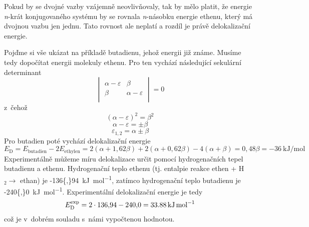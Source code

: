 Pokud by se dvojné vazby vzájemně neovlivňovaly, tak by mělo platit, že  energie
\textit{n}-krát konjugovaného systému by se rovnala \textit{n}-násobku energie ethenu, který má dvojnou vazbu jen jednu. Tato rovnost ale neplatí a rozdíl je právě delokalizační energie. 

Pojďme si vše ukázat na příkladě butadienu, jehož energii již známe. Musíme tedy dopočítat energii molekuly ethenu. Pro ten vychází následující sekulární determinant 
\begin{equation}
\begin{vmatrix}
\alpha - \varepsilon & \beta \\
\beta & \alpha - \varepsilon \\
\end{vmatrix}
=0
\end{equation}
z~čehož
$$
(\alpha-\varepsilon)^2=\beta^2
$$
$$
\alpha - \varepsilon = \pm \beta
$$
$$
\varepsilon_{1,2}= \alpha\pm \beta 
$$
Pro butadien poté vychází delokalizační energie
\begin{equation}
E_{\mathrm{D}} = E_{\mathrm{butadien}} - 2E_{\mathrm{ethylen}}=2(\alpha + 1{,}62\beta)+ 2(\alpha + 0{,}62\beta) - 4(\alpha + \beta) =0{,}48\beta = -\SI{36}{\kJ\per\mol}
\end{equation}
%
Experimentálně můžeme míru delokalizace určit pomocí hydrogenačních tepel butadienu a ethenu.
Hydrogenační teplo ethenu (tj. entalpie reakce ethen + H$_2 \xrightarrow{}$ ethan) je
\SI{-136{,}94}{\kJ\per\mol}, zatímco hydrogenační teplo butadienu je \SI{-240{,}0}{\kJ\per\mol}. Experimentální delokalizační energie je tedy
\begin{equation}
E_{\mathrm{D}}^{\mathrm{exp}}=2\cdot136{,}94-240{,}0 = \SI{33{,}88}{\kJ\per\mol}
\end{equation}
\noindent což je v~dobrém souladu s~námi vypočtenou hodnotou.

